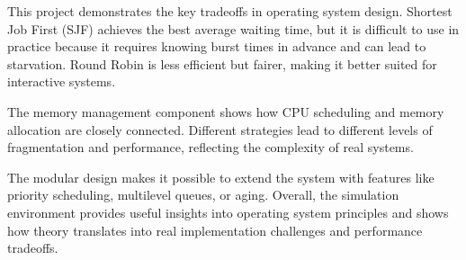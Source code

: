 \documentclass[12pt]{article}
\begin{document}
This project demonstrates the key tradeoffs in operating system design.  
Shortest Job First (SJF) achieves the best average waiting time, but it is difficult to use in practice because it requires knowing burst times in advance and can lead to starvation.  
Round Robin is less efficient but fairer, making it better suited for interactive systems.  

The memory management component shows how CPU scheduling and memory allocation are closely connected. Different strategies lead to different levels of fragmentation and performance, reflecting the complexity of real systems.  

The modular design makes it possible to extend the system with features like priority scheduling, multilevel queues, or aging. Overall, the simulation environment provides useful insights into operating system principles and shows how theory translates into real implementation challenges and performance tradeoffs.  
\end{document}
